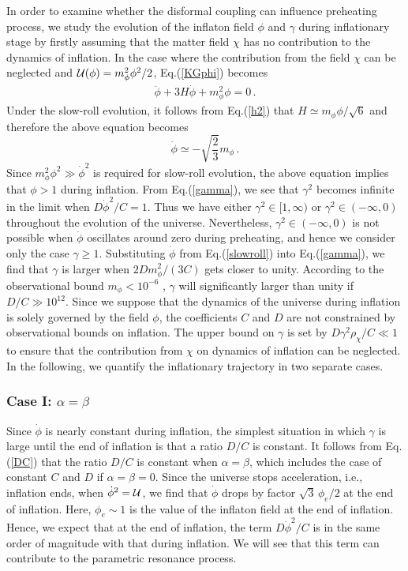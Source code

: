\documentclass[aps,prd,amsmath,amssymb,preprintnumbers,onecolumn,11pt,nofootinbib]{revtex4}
\begin{document}
In order to examine whether the disformal coupling can influence preheating process, we study the evolution of the inflaton field $\phi$ and $\gamma$ during inflationary stage by firstly assuming that the matter field $\chi$ has no contribution to the dynamics of inflation.
In the case where the contribution from the field $\chi$ can be neglected
and ${\cal U}(\phi)= m^{2}_{\phi}\phi^{2} / 2$, Eq.(\ref{KGphi}) becomes
\begin{eqnarray} \label{KGphia}
\ddot{\phi} +3H\dot{\phi}+m^{2}_{\phi}\phi =  0\,.
\end{eqnarray}
Under the slow-roll evolution, it follows from Eq.(\ref{h2}) that $H \simeq m_\phi \phi / \sqrt{6}$ and therefore the above equation becomes
\begin{equation}\label{slowroll}
\dot\phi \simeq - \sqrt{\frac 23 } m_\phi\,.
\end{equation}
Since $m_\phi^2 \phi^2 \gg \dot\phi^2$ is required for slow-roll evolution, the above equation implies that $\phi > 1$ during inflation. From Eq.(\ref{gamma}),
we see that $\gamma^2$ becomes infinite in the limit when $D \dot\phi^2 / C = 1$.
Thus we have either $\gamma^2 \in [1, \infty)$ or $\gamma^2 \in (-\infty, 0)$ throughout the evolution of the universe.
Nevertheless, $\gamma^2 \in (-\infty, 0)$ is not possible when $\dot\phi$ oscillates around zero during preheating,
and hence we consider only the case $\gamma \geq 1$.
Substituting $\dot\phi$ from Eq.(\ref{slowroll}) into Eq.(\ref{gamma}),
we find that $\gamma$ is larger when $2D m_\phi^2 / (3 C)$ gets closer to unity.
According to the observational bound $m_{\phi} < 10^{-6}$ \cite{ArmendarizPicon:2007iv},
$\gamma$ will significantly larger than unity if $D/C \gg 10^{12}$.
Since we suppose that the dynamics of the universe during inflation is solely governed by the field $\phi$,
the coefficients $C$ and $D$ are not constrained by  observational bounds on inflation.
The upper bound on $\gamma$ is set by $D\gamma^2\rho_\chi / C \ll 1$ to ensure that the contribution from $\chi$ on dynamics of inflation can be neglected. In the following, we quantify the inflationary trajectory in two separate cases.
\subsubsection{{\rm Case I:} $\alpha=\beta$}
Since $\dot\phi$ is nearly constant during inflation,
the simplest situation in which $\gamma$ is large until the end of inflation is that a ratio $D/C$ is constant.
It follows from Eq.(\ref{DC}) that the ratio $D/C$ is constant when $\alpha = \beta$,
which includes the case of constant $C$ and $D$ if $\alpha = \beta = 0$.
Since the universe stops acceleration, i.e., inflation ends,
when $\dot\phi^2 = {\cal U}$,
we find that $\dot\phi$ drops by factor $\sqrt{3} \,\phi_{e} / 2$ at the end of inflation.
Here, $\phi_e \sim 1$ is the value of the inflaton field at the end of inflation.
Hence, we expect that at the end of inflation, the term $D \dot\phi^2 / C$ is in the same order of magnitude with that during inflation.
We will see that this term can contribute to the parametric resonance process.
\end{document}
